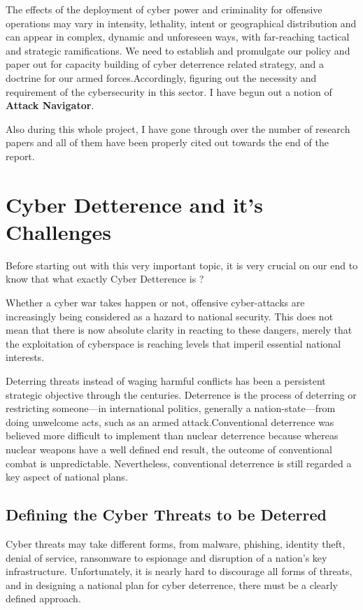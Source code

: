 \documentclass{article}
\begin{document}
The effects of the deployment of cyber power and criminality for offensive operations may vary in intensity, lethality, intent or geographical distribution and can appear in complex, dynamic and unforeseen ways, with far-reaching tactical and strategic ramifications. We need to establish and promulgate our policy and paper out for capacity building of cyber deterrence related strategy, and a doctrine for our armed forces.Accordingly, figuring out the necessity and requirement of the cybersecurity in this sector. I have begun out a notion of \textbf{Attack Navigator}.

Also during this whole project, I have gone through over the number of research papers and all of them have been properly cited out towards the end of the report. 

\section{Cyber Detterence and it's Challenges}

Before starting out with this very important topic, it is very crucial on our end to know that what exactly Cyber Detterence is ? 

Whether a cyber war takes happen or not, offensive cyber-attacks are increasingly being considered as a hazard to national security. This does not mean that there is now absolute clarity in reacting to these dangers, merely that the exploitation of cyberspace is reaching levels that imperil essential national interests.

Deterring threats instead of waging harmful conflicts has been a persistent strategic objective through the centuries. Deterrence is the process of deterring or restricting someone—in international politics, generally a nation-state—from doing unwelcome acts, such as an armed attack.Conventional deterrence was believed more difficult to implement than nuclear deterrence because whereas nuclear weapons have a well defined end result, the outcome of conventional combat is unpredictable. Nevertheless, conventional deterrence is still regarded a key aspect of national plans.

\subsection{Defining the Cyber Threats to be Deterred}
Cyber threats may take different forms, from malware, phishing, identity theft, denial of service, ransomware to espionage and disruption of a nation's key infrastructure. Unfortunately, it is nearly hard to discourage all forms of threats, and in designing a national plan for cyber deterrence, there must be a clearly defined approach.
\end{document}
